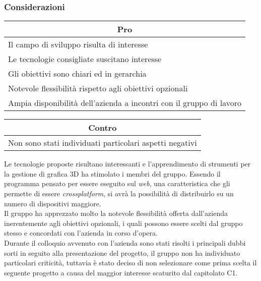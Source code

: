 \subsubsection{Considerazioni}
\begin{minipage}[t]{0.45\linewidth}
    \vspace{0pt}
    {\renewcommand{\arraystretch}{1.5}
    \begin{tabular}{p{1\linewidth}}
        \multicolumn{1}{c}{\textbf{Pro}} \\
        \midrule
		Il campo di sviluppo risulta di interesse \\
		Le tecnologie consigliate suscitano interesse \\
		Gli obiettivi sono chiari ed in gerarchia \\
		Notevole flessibilità rispetto agli obiettivi opzionali \\
		Ampia disponibilità dell'azienda a incontri con il gruppo di lavoro \\
        \hline
    \end{tabular}
    }
\end{minipage}
\hspace{0.05\linewidth}
\begin{minipage}[t]{0.45\linewidth}
    \vspace{0pt}
    {\renewcommand{\arraystretch}{1.5}
    \begin{tabular}{p{1\linewidth}}
        \multicolumn{1}{c}{\textbf{Contro}} \\
        \midrule
        Non sono stati individuati particolari aspetti negativi \\
        \hline
    \end{tabular}
    }
\end{minipage}
\vspace{1em}

\noindent
Le tecnologie proposte risultano interessanti e l'apprendimento di strumenti per la gestione di grafica 3D ha stimolato i membri del gruppo.
Essendo il programma pensato per essere eseguito sul \textit{web}, una caratteristica che gli permette di essere \textit{crossplatform}, si avrà la possibilità di distribuirlo su un numero di dispositivi maggiore.\\
Il gruppo ha apprezzato molto la notevole flessibilità offerta dall'azienda inerentemente agli obiettivi opzionali, i quali possono essere scelti dal gruppo stesso e concordati con l'azienda in corso d'opera.\\
Durante il colloquio avvenuto con l'azienda sono stati risolti i principali dubbi sorti in seguito alla presentazione del progetto, il gruppo non ha individuato particolari criticità, tuttavia è stato deciso di non selezionare come prima scelta il seguente progetto a causa del maggior interesse scaturito dal capitolato C1.